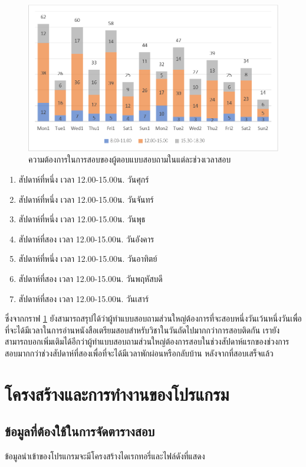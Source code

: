 \begin{figure}
  \begin{center}
    \includegraphics[width=\linewidth]{images/bar_chart_for_final_exam_slot.png}
  \end{center}
  \caption[ความต้องการในการสอบของผู้ตอบแบบสอบถามในแต่ละช่วงเวลาสอบ]{ความต้องการในการสอบของผู้ตอบแบบสอบถามในแต่ละช่วงเวลาสอบ}
  \label{fig:time_slot}     
\end{figure}
\begin{enumerate}
  \item สัปดาห์ที่หนึ่ง เวลา 12.00-15.00น. วันศุกร์ 
  \item สัปดาห์ที่หนึ่ง เวลา 12.00-15.00น. วันจันทร์
  \item สัปดาห์ที่หนึ่ง เวลา 12.00-15.00น. วันพุธ
  \item สัปดาห์ที่สอง เวลา 12.00-15.00น. วันอังคาร
  \item สัปดาห์ที่หนึ่ง เวลา 12.00-15.00น. วันอาทิตย์
  \item สัปดาห์ที่สอง เวลา 12.00-15.00น. วันพฤหัสบดี
  \item สัปดาห์ที่สอง เวลา 12.00-15.00น. วันเสาร์
\end{enumerate}

ซึ่งจากกราฟ \ref{fig:time_slot} ยังสามารถสรุปได้ว่าผู้ทำแบบสอบถามส่วนใหญ่ต้องการที่จะสอบหนึ่งวันเว้นหนึ่งวันเพื่อที่จะได้มีเวลาในการอ่านหนังสือเตรียมสอบสำหรับวิชาในวันถัดไปมากกว่าการสอบติดกัน 
เรายังสามารถบอกเพิ่มเติมได้อีกว่าผู้ทำแบบสอบถามส่วนใหญ่ต้องการสอบในช่วงสัปดาห์แรกของช่วงการสอบมากกว่าช่วงสัปดาห์ที่สองเพื่อที่จะได้มีเวลาพักผ่อนหรือกลับบ้าน หลังจากที่สอบเสร็จแล้ว
\newpage
\section{โครงสร้างและการทำงานของโปรแกรม}
\subsection{ข้อมูลที่ต้องใช้ในการจัดตารางสอบ}
ข้อมูลนำเข้าของโปรแกรมจะมีโครงสร้างไดเรกทอรี่และไฟล์ดังที่แสดง

